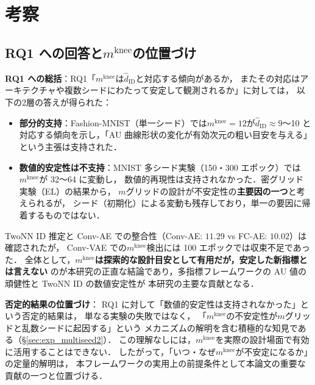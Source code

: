 \documentclass[11pt,a4paper]{jsarticle}
\newcommand{\mknee}{m^{\mathrm{knee}}}
\begin{document}
\section{考察}\label{sec:discussion}

\subsection{RQ1 への回答と$\mknee$の位置づけ}\label{sec:disc_mknee}

\textbf{RQ1 への総括}：RQ1「$\mknee$は$\hat{d}_\mathrm{ID}$と対応する傾向があるか，
またその対応はアーキテクチャや複数シードにわたって安定して観測されるか」に対しては，
以下の2層の答えが得られた：

\begin{itemize}
  \item \textbf{部分的支持}：Fashion-MNIST（単一シード）では$\mknee = 12$が$\hat{d}_\mathrm{ID} \approx 9$〜10
        と対応する傾向を示し，「AU 曲線形状の変化が有効次元の粗い目安を与える」という主張は支持された．
  \item \textbf{数値的安定性は不支持}：MNIST 多シード実験（150・300 エポック）では$\mknee$が 32〜64 に変動し，
        数値的再現性は支持されなかった．密グリッド実験（EL）の結果から，
        $m$グリッドの設計が不安定性の\textbf{主要因の一つ}と考えられるが，
        シード（初期化）による変動も残存しており，単一の要因に帰着するものではない．
\end{itemize}

TwoNN ID 推定と Conv-AE での整合性（Conv-AE: $11.29$ vs FC-AE: $10.02$）は確認されたが，
Conv-VAE での$\mknee$検出には 100 エポックでは収束不足であった．
全体として，\textbf{$\mknee$は探索的な設計目安として有用だが，安定した新指標とは言えない}
のが本研究の正直な結論であり，多指標フレームワークの AU 値の頑健性と TwoNN ID の数値安定性が
本研究の主要な貢献となる．

\textbf{否定的結果の位置づけ}：
RQ1 に対して「数値的安定性は支持されなかった」という否定的結果は，
単なる実験の失敗ではなく，
「$\mknee$の不安定性が$m$グリッドと乱数シードに起因する」という
メカニズムの解明を含む積極的な知見である（§\ref{sec:exp_multiseed2}）．
この理解なしには，$\mknee$を実際の設計場面で有効に活用することはできない．
したがって，「いつ・なぜ$\mknee$が不安定になるか」の定量的解明は，
本フレームワークの実用上の前提条件として本論文の重要な貢献の一つと位置づける．
\end{document}
